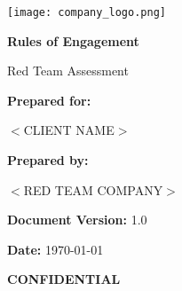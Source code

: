 \documentclass[12pt,letterpaper]{article}
\begin{document}
\begin{titlepage}
    \centering
    \vspace*{1cm}
    {\texttt{[image: company\_logo.png]}\par}
    \vspace{1.5cm}
    {\Huge\bfseries\textcolor{primary}{Rules of Engagement}\par}
    \vspace{1cm}
    {\Large\textcolor{secondary}{Red Team Assessment}\par}
    \vspace{2cm}
    {\Large\textbf{Prepared for:}\par}
    \vspace{0.5cm}
    {\large $<$CLIENT NAME$>$\par}
    \vspace{2cm}
    {\Large\textbf{Prepared by:}\par}
    \vspace{0.5cm}
    {\large $<$RED TEAM COMPANY$>$\par}
    \vspace{1.5cm}
    {\large\textbf{Document Version:} 1.0\par}
    \vspace{0.5cm}
    {\large\textbf{Date:} \today\par}
    
    \vfill
    
    {\large\textbf{CONFIDENTIAL}\par}
\end{titlepage}

\newpage
\tableofcontents
\newpage
\end{document}
